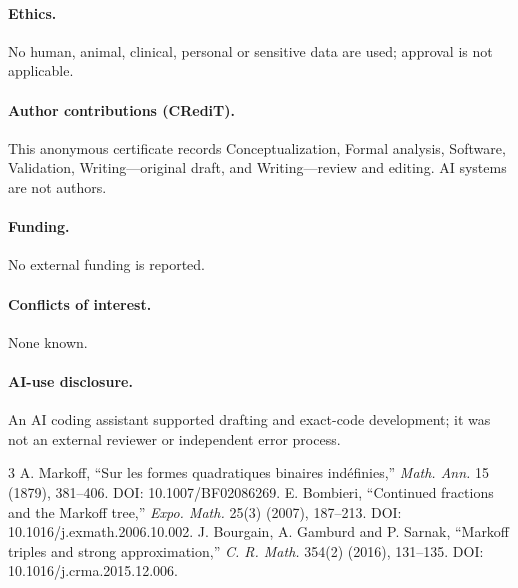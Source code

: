 \documentclass[9pt]{extarticle}
\begin{document}
\paragraph{Ethics.} No human, animal, clinical, personal or sensitive data are
used; approval is not applicable.
\paragraph{Author contributions (CRediT).} This anonymous certificate records
Conceptualization, Formal analysis, Software, Validation, Writing---original
draft, and Writing---review and editing. AI systems are not authors.
\paragraph{Funding.} No external funding is reported.
\paragraph{Conflicts of interest.} None known.
\paragraph{AI-use disclosure.} An AI coding assistant supported drafting and
exact-code development; it was not an external reviewer or independent error
process.

\begin{thebibliography}{3}
 A. Markoff, ``Sur les formes quadratiques binaires
ind\'efinies,'' \emph{Math. Ann.} 15 (1879), 381--406.
DOI: 10.1007/BF02086269.
 E. Bombieri, ``Continued fractions and the Markoff tree,''
\emph{Expo. Math.} 25(3) (2007), 187--213.
DOI: 10.1016/j.exmath.2006.10.002.
 J. Bourgain, A. Gamburd and P. Sarnak, ``Markoff triples and
strong approximation,'' \emph{C. R. Math.} 354(2) (2016), 131--135.
DOI: 10.1016/j.crma.2015.12.006.
\end{thebibliography}
\end{document}
